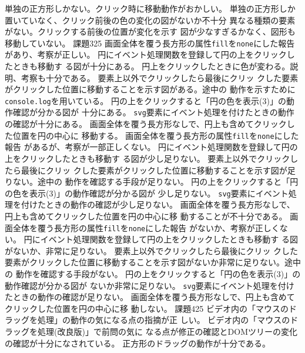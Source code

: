 \documentclass[a4j]{jreport}
\begin{document}
{{ {\Must 単独の正方形しかない。クリック時に移動動作がおかしい。\ResultA}
 {単独の正方形しか置いていなく、クリック前後の色の変化の図がないか不十分\ResultA}
 {異なる種類の要素がない。クリックする前後の位置が変化を示す
 図が少なすぎるかなく、図形も移動していない。\ResultA}
 }
 {課題3}{25}
 {
 {\Must 画面全体を覆う長方形の属性\texttt{fill}を\texttt{none}にした報告
 があり、考察が正しい。\ResultEI}
 {\Must 円にイベント処理関数を登録して円の上をクリックしたときも移動す
 る図が十分にある。\ResultA}
 {円上をクリックしたときに色が変わる。説明、考察も十分である。\ResultA}
 {要素上以外でクリックしたら最後にクリッ
  クした要素がクリックした位置に移動することを示す図がある。途中の
  動作を示すために\texttt{console.log}を用いている。\ResultA}
 {\Must 円の上をクリックすると「円の色を表示(3)」の動作確認が分かる図が
 十分にある。\ResultA}
 {\texttt{svg}要素にイベント処理を付けたときの動作の確認が十分にある。\ResultA}
 {画面全体を覆う長方形なしで、円上も含めてクリックした位置を円の中心に
 移動する。\ResultA}
 }
 {
 {\Must 画面全体を覆う長方形の属性\texttt{fill}を\texttt{none}にした報告
 があるが、考察が一部正しくない。\ResultEI}
 {\Must 円にイベント処理関数を登録して円の上をクリックしたときも移動す
 る図が少し足りない。\ResultA}
 {要素上以外でクリックしたら最後にクリッ
  クした要素がクリックした位置に移動することを示す図が足りない。途中の
  動作を確認する手段が足りない。\ResultA}
 {\Must 円の上をクリックすると「円の色を表示(3)」の動作確認が分かる図が
 少し足りない。\ResultA}
 {\texttt{svg}要素にイベント処理を付けたときの動作の確認が少し足りない。\ResultA}
 {画面全体を覆う長方形なしで、円上も含めてクリックした位置を円の中心に移
 動することが不十分である。\ResultA}
 }
 {
 {\Must 画面全体を覆う長方形の属性\texttt{fill}を\texttt{none}にした報告
 がないか、考察が正しくない。\ResultEI}
 {\Must 円にイベント処理関数を登録して円の上をクリックしたときも移動す
 る図がないか、非常に足りない。\ResultA}
 {要素上以外でクリックしたら最後にクリッ
  クした要素がクリックした位置に移動することを示す図がないか非常に足りない。途中の
  動作を確認する手段がない。\ResultA}
 {\Must 円の上をクリックすると「円の色を表示(3)」の動作確認が分かる図が
 ないか非常に足りない。\ResultA}
 {\texttt{svg}要素にイベント処理を付けたときの動作の確認が足りない。\ResultA}
 {画面全体を覆う長方形なしで、円上も含めてクリックした位置を円の中心に移
 動しない。\ResultA}
 }
 {課題4}{25}
 {
 {\Must ビデオ内の「マウスのドラッグを処理」の動作の気になる点の指摘が正
 しい。\ResultFI}
{\Must ビデオ内の「マウスのドラッグを処理(改良版)」で前問の気に
なる点が修正の確認とDOMツリーの変化の確認が十分になされている。\ResultA}
{\Must 正方形のドラッグの動作が十分である。}
}}
\end{document}
